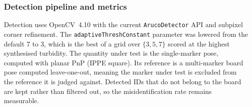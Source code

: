 \subsubsection{Detection pipeline and metrics}

Detection uses OpenCV~4.10 with the current \texttt{ArucoDetector} API and subpixel corner refinement. The \texttt{adaptiveThreshConstant} parameter was lowered from the default 7 to 3, which is the best of a grid over $\{3, 5, 7\}$ scored at the highest synthesised turbidity. The quantity under test is the single-marker pose, computed with planar PnP (IPPE square). Its reference is a multi-marker board pose computed leave-one-out, meaning the marker under test is excluded from the reference it is judged against. Detected IDs that do not belong to the board are kept rather than filtered out, so the misidentification rate remains measurable.
